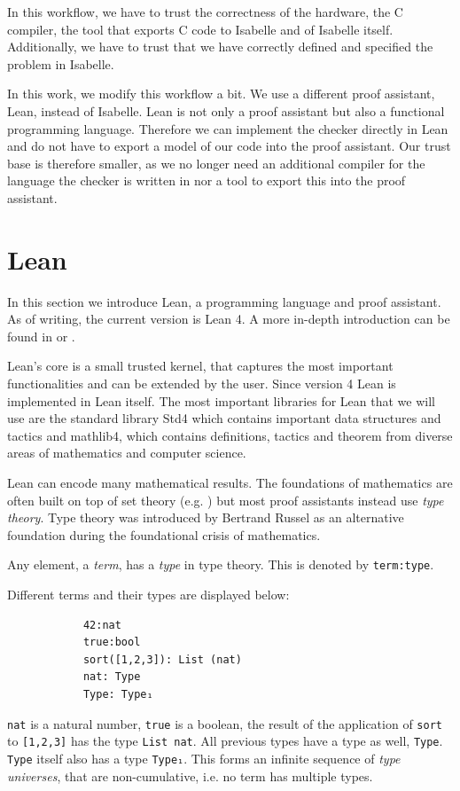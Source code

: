 In this workflow, we have to trust the correctness of the hardware, the C compiler, the tool that exports C code to Isabelle and of Isabelle itself. Additionally, we have to trust that we have correctly defined and specified the problem in Isabelle.

In this work, we modify this workflow a bit. We use a different proof assistant, Lean, instead of Isabelle. Lean is not only a proof assistant but also a functional programming language. Therefore we can implement the checker directly in Lean and do not have to export a model of our code into the proof assistant. Our trust base is therefore smaller, as we no longer need an additional compiler for the language the checker is written in nor a tool to export this into the proof assistant. 


\section{Lean}
In this section we introduce Lean, a programming language and proof assistant. As of writing, the current version is Lean 4. A more in-depth introduction can be found in \cite{theoremProvingLean} or \cite{functionalProgrammingLean}.

Lean's core is a small trusted kernel\cite{LeanSysDescr}, that captures the most important functionalities and can be extended by the user. Since version 4 Lean is implemented in Lean itself\cite{Lean4}. The most important libraries for Lean that we will use are the standard library Std4\cite{stdLean} which contains important data structures and tactics and mathlib4\cite{mathlib}, which contains definitions, tactics and theorem from diverse areas of mathematics and computer science.

Lean can encode many mathematical results. The foundations of mathematics are often built on top of set theory (e.g. \cite{logic}) but most proof assistants instead use \textit{type theory}. Type theory was introduced by Bertrand Russel as an alternative foundation during the foundational crisis of mathematics.

Any element, a \textit{term}, has a \textit{type} in type theory. This is denoted by \lstinline|term:type|. 

\begin{example}
    Different terms and their types are displayed below:
        \begin{lstlisting}
            42:nat
            true:bool
            sort([1,2,3]): List (nat)
            nat: Type
            Type: Type₁
        \end{lstlisting}

        \lstinline|nat| is a natural number, \lstinline|true| is a boolean, the result of the application of \lstinline|sort| to \lstinline|[1,2,3]| has the type \lstinline|List nat|. All previous types have a type as well, \lstinline|Type|. \lstinline|Type| itself also has a type \lstinline|Type₁|. This forms an infinite sequence of \textit{type universes}, that are non-cumulative, i.e. no term has multiple types.
\end{example}


